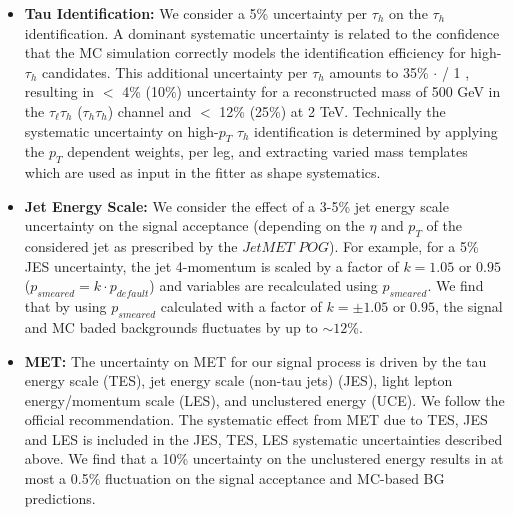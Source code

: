\begin{itemize}
 \item \textbf{Tau Identification:} We consider a 5\% uncertainty per $\tau_{h}$ on the $\tau_{h}$ identification.
A dominant systematic uncertainty is related to the confidence that the MC simulation correctly models the identification 
efficiency for high-\pt $\tau_{h}$ candidates. This additional uncertainty per $\tau_{h}$ amounts to 35\% $\cdot$ \pt / 1 \TeV, 
resulting in $<$ 4\% (10\%) uncertainty for a reconstructed mass of 500 GeV in the $\tau_{\ell} \tau_{h}$ ($\tau_{h}\tau_{h}$) 
channel and $<$ 12\% (25\%) at 2 TeV. Technically the systematic uncertainty on high-$p_{T}$ $\tau_{h}$ identification is determined by 
applying the $p_{T}$ dependent weights, per leg, and extracting varied mass templates which are used as input in the fitter as 
shape systematics. 

  \item \textbf{Jet Energy Scale:} We consider the effect of a 3-5\% jet energy scale uncertainty on the signal 
acceptance (depending on the $\eta$ and $p_{T}$ of the considered jet as prescribed by the $JetMET$ $POG$). For example, for a 5\% JES uncertainty, the jet 
4-momentum is scaled by a factor of $k=1.05$ or $0.95$ ($p_{smeared} = k \cdot p_{default}$) and variables are recalculated 
using $p_{smeared}$. We find that by using $p_{smeared}$ calculated with
a factor of $k=\pm 1.05$ or $0.95$, the signal and MC baded backgrounds fluctuates by up to $\sim 12$\%. 
  \item \textbf{MET:} The uncertainty on MET for our signal process is driven by the tau energy scale (TES), jet energy 
scale (non-tau jets) (JES), light lepton energy/momentum scale (LES), and unclustered energy (UCE). We follow the official recommendation. 
The systematic effect from MET due to TES, JES and LES is included in the JES, 
TES, LES systematic uncertainties described above. We find that a 10\% uncertainty on the unclustered energy results 
in at most a 0.5\% fluctuation on the signal acceptance and MC-based BG predictions.
%


\end{itemize}
